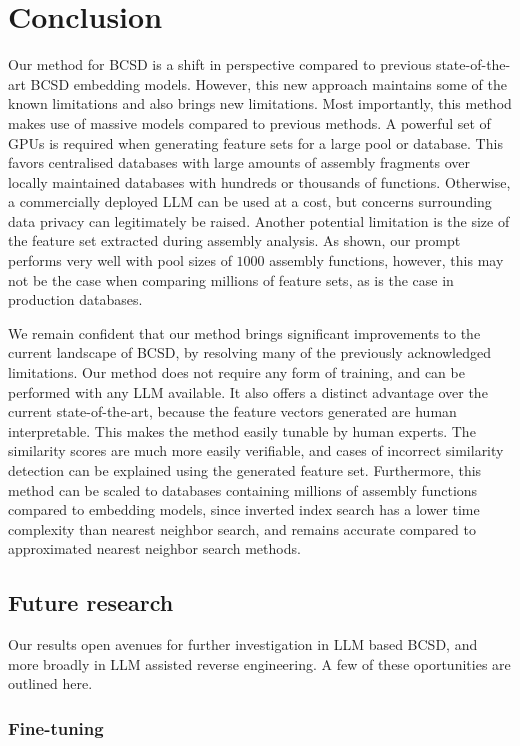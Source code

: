 \section{Conclusion}

Our method for BCSD is a shift in perspective compared to previous state-of-the-art BCSD embedding models. However,
this new approach maintains some of the known limitations and also brings new limitations. Most importantly, this
method makes use of massive models compared to previous methods. A powerful set of GPUs is required when generating
feature sets for a large pool or database. This favors centralised databases with large amounts of assembly fragments over
locally maintained databases with hundreds or thousands of functions. Otherwise, a commercially deployed LLM can be used at a
cost, but concerns surrounding data privacy can legitimately be raised. Another potential limitation is the size of the feature
set extracted during assembly analysis. As shown, our prompt performs very well with pool sizes of \(1000\) assembly functions,
however, this may not be the case when comparing millions of feature sets, as is the case in production databases.

We remain confident that our method brings significant improvements to the current landscape of BCSD, by resolving
many of the previously acknowledged limitations. Our method does not require any form of training, and can be performed with any LLM
available. It also offers a distinct advantage over the current state-of-the-art, because the feature vectors generated are human
interpretable. This makes the method easily tunable by human experts. The similarity scores are much more easily verifiable, and
cases of incorrect similarity detection can be explained using the generated feature set. Furthermore, this method can be scaled to
databases containing millions of assembly functions compared to embedding models, since inverted index search has a lower time
complexity than nearest neighbor search, and remains accurate compared to approximated nearest neighbor search methods.

\subsection{Future research}

Our results open avenues for further investigation in LLM based BCSD, and more broadly in LLM assisted reverse engineering.
A few of these oportunities are outlined here.

\subsubsection{Fine-tuning}

